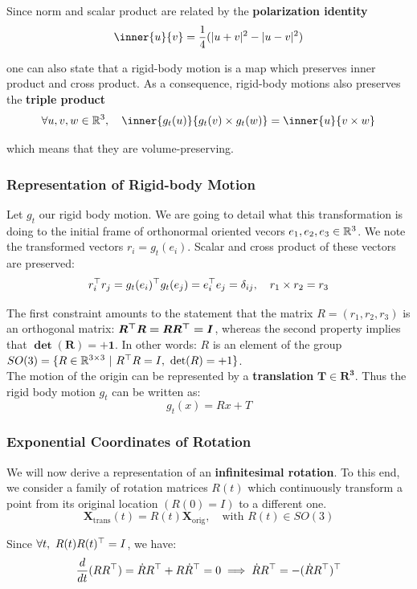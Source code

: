 Since norm and scalar product are related by the \textbf{polarization identity}
\[\inner{u}{v} = \frac{1}{4}(|u+v|^2 - |u-v|^2)\]

one can also state that a rigid-body motion is a map which
preserves inner product and cross product.
As a consequence, rigid-body motions also preserves the \textbf{triple product}
\[\forall u, v, w \in \R^3, \quad
	\inner{g_t(u)}{g_t(v) \times g_t(w)} = \inner{u}{v \times w}\]

which means that they are volume-preserving.


\subsubsection{Representation of Rigid-body Motion}%
\label{ssub:representation_of_rigid_body_motion}

Let $g_t$ our rigid body motion. We are going to detail what this transformation
is doing to the initial frame of orthonormal oriented vecors
$e_1, e_2, e_3 \in \mathbb{R}^3$.
We note the transformed vectors $r_i = g_t(e_i)$.
Scalar and cross product of these vectors are preserved:
	\[r_i^{\top}r_j = g_t(e_i)^{\top}g_t(e_j) = e_i^{\top}e_j = \delta_{ij}, \quad
	r_1 \times r_2 = r_3\]

The first constraint amounts to the statement that the matrix
$R = (r_1, r_2, r_3)$ is an orthogonal matrix: $\bm{R^{\top}R=RR^{\top}=I}$,
whereas the second property implies that $\bm{\det(R) = +1}$.
In other words: $R$ is an element of the group
$SO(3) = \{R \in \mathbb{R}^{3 \times{} 3}\ |\ R^{\top}R=I,\ \det(R) = +1\}$.\\

The motion of the origin can be represented by a \textbf{translation}
$\bm{T \in R^3}$. Thus the rigid body motion $g_t$ can be written as:
	\[g_t(x) = Rx + T\]


\subsubsection{Exponential Coordinates of Rotation}%
\label{ssub:exponential_coordinates_of_rotation}

We will now derive a representation of an \textbf{infinitesimal rotation}.
To this end, we consider a family of rotation matrices $R(t)$
which continuously transform a point from its original location
$(R(0) = I)$ to a different one.
	\[\bm{X}_{\text{trans}}(t) = R(t)\bm{X}_{\text{orig}}, \quad
	\text{with } R(t) \in SO(3)\]

Since $\forall t,\ R(t)R(t)^{\top} = I$, we have:
	\[\frac{d}{dt}(RR^{\top}) = \dot{R}R^{\top} + R\dot{R}^{\top}= 0
	\implies \dot{R}R^{\top} = -( \dot{R}R^{\top} )^{\top}\]

